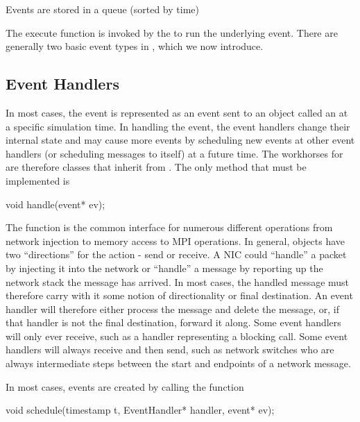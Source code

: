 Events are stored in a queue (sorted by time)

\begin{CppCode}
namespace sstmac {

class ExecutionEvent
{
 public:
  virtual void execute() = 0;

  ...
};
\end{CppCode}

The execute function is invoked by the \evmgr to run the underlying event.
There are generally two basic event types in \sstmacro, which we now introduce.

\subsection{Event Handlers}
\label{subsec:eventHandlers}
In most cases, the event is represented as an event sent to an object called an \evhandler at a specific simulation time.
In handling the event, the event handlers change their internal state and may cause more events
by scheduling new events at other event handlers (or scheduling messages to itself) at a future time.
The workhorses for \sstmacro are therefore classes that inherit from \evhandler.
The only method that must be implemented is

\begin{CppCode}
void handle(event* ev);
\end{CppCode}
The function is the common interface for numerous different operations from network injection to memory access to MPI operations.
In general, objects have two ``directions'' for the action - send or receive.
A NIC could ``handle'' a packet by injecting it into the network or ``handle'' a message by reporting up the network stack the message has arrived.
In most cases, the handled message must therefore carry with it some notion of directionality or final destination.
An event handler will therefore either process the message and delete the message, or, if that handler is not the final destination, forward it along.
Some event handlers will only ever receive, such as a handler representing a blocking  call.
Some event handlers will always receive and then send, such as network switches who are always intermediate steps between the start and endpoints of a network message.

In most cases, events are created by calling the function

\begin{CppCode}
void schedule(timestamp t,
  EventHandler* handler,
  event* ev);
\end{CppCode}

